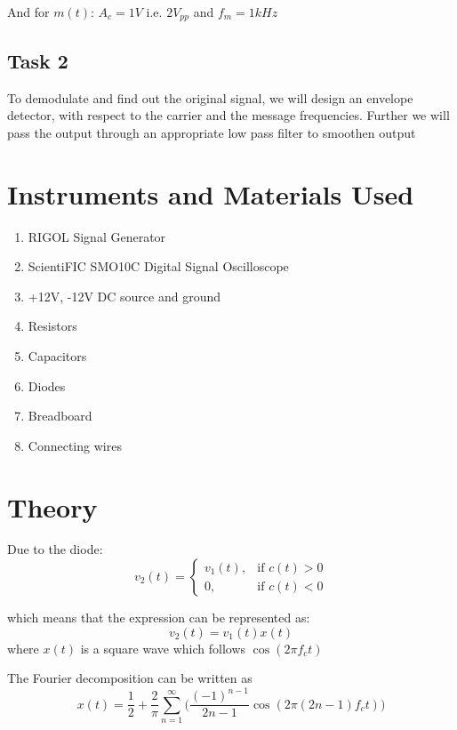 \documentclass{article}
\begin{document}
And for $m(t)$: $A_c=1V$ i.e. $2V_{pp}$ and $f_m=1kHz$

\subsection{Task 2}
To demodulate and find out the original signal, we will design an envelope detector, with respect to the carrier and the message frequencies. Further we will pass the output through an appropriate low pass filter to smoothen output 

\section{Instruments and Materials Used}
\begin{enumerate}
  \item RIGOL Signal Generator
  \item ScientiFIC SMO10C Digital Signal Oscilloscope
  \item +12V, -12V DC source and ground
  \item Resistors
  \item Capacitors
  \item Diodes
  \item Breadboard
  \item Connecting wires
\end{enumerate}

\section{Theory}
Due to the diode:
\begin{equation}
    v_2(t)=\begin{cases}
        v_1(t),& \text{if } c(t) > 0\\
        0, & \text{if } c(t) < 0
    \end{cases}
\end{equation}


which means that the expression can be represented as:
\begin{equation}
    v_2(t)=v_1(t)x(t)
\end{equation}
where $x(t)$ is a square wave which follows $\cos(2\pi f_c t)$

The Fourier decomposition can be written as 
\begin{equation}
  x(t) = \frac{1}{2}+\frac{2}{\pi}\sum_{n=1}^\infty \Bigg(\frac{(-1)^{n-1}}{2n-1}\cos(2\pi(2n-1)f_c t)\Bigg)
\end{equation}
\end{document}

